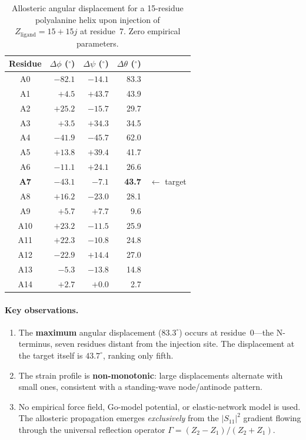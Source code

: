 \begin{table}[H]
\centering
\caption{Allosteric angular displacement for a 15-residue polyalanine
helix upon injection of $Z_\text{ligand} = 15 + 15j$ at residue~7.
Zero empirical parameters.}
\label{tab:allostery}
\small
\begin{tabular}{@{}c r r r l@{}}
\toprule
\textbf{Residue} & $\Delta\phi$ ($^\circ$) & $\Delta\psi$ ($^\circ$)
  & $\Delta\theta$ ($^\circ$) & \\
\midrule
A0  &  $-82.1$ &  $-14.1$ & 83.3 & \\
A1  &   $+4.5$ &  $+43.7$ & 43.9 & \\
A2  &  $+25.2$ &  $-15.7$ & 29.7 & \\
A3  &   $+3.5$ &  $+34.3$ & 34.5 & \\
A4  &  $-41.9$ &  $-45.7$ & 62.0 & \\
A5  &  $+13.8$ &  $+39.4$ & 41.7 & \\
A6  &  $-11.1$ &  $+24.1$ & 26.6 & \\
\textbf{A7} & $-43.1$ & $-7.1$ & \textbf{43.7} & $\longleftarrow$ target \\
A8  &  $+16.2$ &  $-23.0$ & 28.1 & \\
A9  &   $+5.7$ &   $+7.7$ &  9.6 & \\
A10 &  $+23.2$ &  $-11.5$ & 25.9 & \\
A11 &  $+22.3$ &  $-10.8$ & 24.8 & \\
A12 &  $-22.9$ &  $+14.4$ & 27.0 & \\
A13 &   $-5.3$ &  $-13.8$ & 14.8 & \\
A14 &   $+2.7$ &   $+0.0$ &  2.7 & \\
\bottomrule
\end{tabular}
\end{table}

\paragraph{Key observations.}
\begin{enumerate}
    \item The \textbf{maximum} angular displacement ($83.3^\circ$)
          occurs at residue~0---the N-terminus, seven residues distant
          from the injection site.  The displacement at the target
          itself is $43.7^\circ$, ranking only fifth.
    \item The strain profile is \textbf{non-monotonic}: large
          displacements alternate with small ones, consistent with a
          standing-wave node/antinode pattern.
    \item No empirical force field, Go-model potential, or
          elastic-network model is used.  The allosteric propagation
          emerges \emph{exclusively} from the $|S_{11}|^2$ gradient
          flowing through the universal reflection operator
          $\Gamma = (Z_2 - Z_1)/(Z_2 + Z_1)$.
\end{enumerate}

